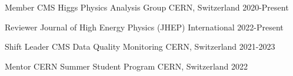 


\begin{cvhonors}


\cvhonor
{Member} %
{CMS Higgs Physics Analysis Group} %
{CERN, Switzerland} %
{2020-Present} %
    

\cvhonor
{Reviewer} %
{Journal of High Energy Physics (JHEP)} %
{International} %
{2022-Present} %


\cvhonor
{Shift Leader} %
{CMS Data Quality Monitoring} %
{CERN, Switzerland} %
{2021-2023} %


\cvhonor
{Mentor} %
{CERN Summer Student Program} %
{CERN, Switzerland} %
{2022} %


\end{cvhonors}
